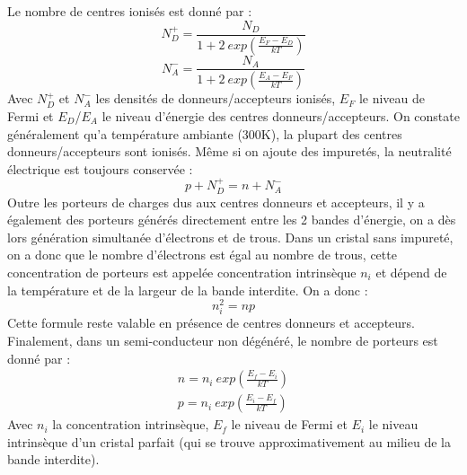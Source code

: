 Le nombre de centres ionisés est donné par :
$$
N_D^+=\frac{N_D}{1+2~exp\left(\frac{E_F-E_D}{kT}\right)}
$$
$$
N_A^-=\frac{N_A}{1+2~exp\left(\frac{E_A-E_F}{kT}\right)}
$$
Avec $N_D^+$ et $N_A^-$ les densités de donneurs/accepteurs ionisés, $E_F$ le niveau de Fermi et $E_D$/$E_A$ le niveau d'énergie des centres donneurs/accepteurs. On constate généralement qu'a température ambiante (300K), la plupart des centres donneurs/accepteurs sont ionisés. Même si on ajoute des impuretés, la neutralité électrique est toujours conservée :
\begin{equation}
p+N_D^+=n+N_A^-
\end{equation}
Outre les porteurs de charges dus aux centres donneurs et accepteurs, il y a également des porteurs générés directement entre les 2 bandes d'énergie, on a dès lors génération simultanée d'électrons et de trous. Dans un cristal sans impureté, on a donc que le nombre d'électrons est égal au nombre de trous, cette concentration de porteurs est appelée concentration intrinsèque $n_i$ et dépend de la température et de la largeur de la bande interdite. On a donc :
\begin{equation}
n_i^2=np
\end{equation}
Cette formule reste valable en présence de centres donneurs et accepteurs. Finalement, dans un semi-conducteur non dégénéré, le nombre de porteurs est donné par :
\begin{equation}
\begin{array}{c}
n=n_i~exp\left(\frac{E_f-E_i}{kT} \right)\\
p=n_i~exp\left(\frac{E_i-E_f}{kT} \right)
\end{array} 
\end{equation}
Avec $ n_i$ la concentration intrinsèque, $E_f$ le niveau de Fermi et $E_i$ le niveau intrinsèque d'un cristal parfait (qui se trouve approximativement au milieu de la bande interdite).
